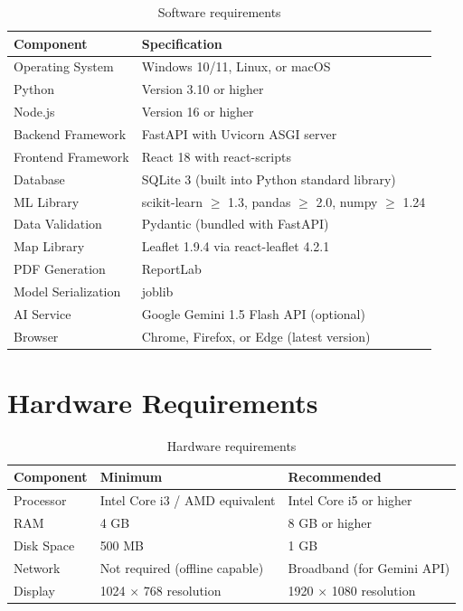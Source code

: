 \begin{table}[H]
\centering
\caption{Software requirements}
\label{tab:software_req}
\begin{tabularx}{\textwidth}{|l|X|}
\hline
\textbf{Component} & \textbf{Specification} \\
\hline
Operating System & Windows 10/11, Linux, or macOS \\
\hline
Python & Version 3.10 or higher \\
\hline
Node.js & Version 16 or higher \\
\hline
Backend Framework & FastAPI with Uvicorn ASGI server \\
\hline
Frontend Framework & React 18 with react-scripts \\
\hline
Database & SQLite 3 (built into Python standard library) \\
\hline
ML Library & scikit-learn $\geq$ 1.3, pandas $\geq$ 2.0, numpy $\geq$ 1.24 \\
\hline
Data Validation & Pydantic (bundled with FastAPI) \\
\hline
Map Library & Leaflet 1.9.4 via react-leaflet 4.2.1 \\
\hline
PDF Generation & ReportLab \\
\hline
Model Serialization & joblib \\
\hline
AI Service & Google Gemini 1.5 Flash API (optional) \\
\hline
Browser & Chrome, Firefox, or Edge (latest version) \\
\hline
\end{tabularx}
\end{table}

\section{Hardware Requirements}
\label{sec:hardware_requirements}

\begin{table}[H]
\centering
\caption{Hardware requirements}
\label{tab:hardware_req}
\begin{tabularx}{\textwidth}{|l|X|X|}
\hline
\textbf{Component} & \textbf{Minimum} & \textbf{Recommended} \\
\hline
Processor & Intel Core i3 / AMD equivalent & Intel Core i5 or higher \\
\hline
RAM & 4 GB & 8 GB or higher \\
\hline
Disk Space & 500 MB & 1 GB \\
\hline
Network & Not required (offline capable) & Broadband (for Gemini API) \\
\hline
Display & 1024 $\times$ 768 resolution & 1920 $\times$ 1080 resolution \\
\hline
\end{tabularx}
\end{table}

